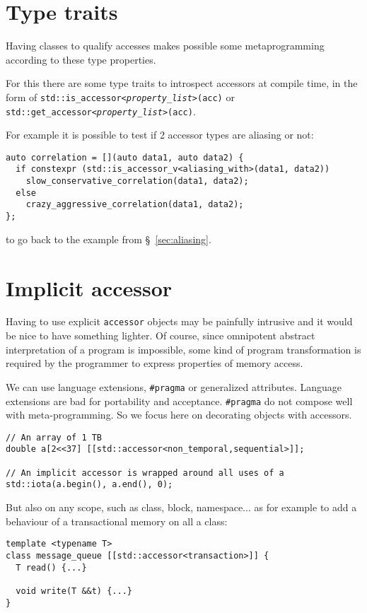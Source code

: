 \documentclass[a4paper]{article}
\begin{document}
\section{Type traits}
\label{sec:type-traits}

Having classes to qualify accesses makes possible some metaprogramming
according to these type properties.

For this there are some type traits to introspect accessors at compile
time, in the form of
\texttt{std::is\_accessor<\emph{property\_list}>(acc)} or
\texttt{std::get\_accessor<\emph{property\_list}>(acc)}.

For example it is possible to test if 2 accessor types are aliasing or
not:
\begin{lstlisting}
auto correlation = [](auto data1, auto data2) {
  if constexpr (std::is_accessor_v<aliasing_with>(data1, data2))
    slow_conservative_correlation(data1, data2);
  else
    crazy_aggressive_correlation(data1, data2);
};
\end{lstlisting}
to go back to the example from \S~\ref{sec:aliasing}.


\section{Implicit accessor}
\label{sec:implicit-accessor}

Having to use explicit \texttt{accessor} objects may be painfully
intrusive and it would be nice to have something lighter. Of course,
since omnipotent abstract interpretation of a program is impossible,
some kind of program transformation is required by the programmer to
express properties of memory access.

We can use language extensions, \lstinline|#pragma| or generalized
attributes. Language extensions are bad for portability and
acceptance. \lstinline|#pragma| do not compose well with
meta-programming. So we focus here on decorating objects with
accessors.

\begin{lstlisting}
// An array of 1 TB
double a[2<<37] [[std::accessor<non_temporal,sequential>]];

// An implicit accessor is wrapped around all uses of a
std::iota(a.begin(), a.end(), 0);
\end{lstlisting}

But also on any scope, such as class, block, namespace... as for
example to add a behaviour of a transactional memory on all a class:
\begin{lstlisting}
template <typename T>
class message_queue [[std::accessor<transaction>]] {
  T read() {...}

  void write(T &&t) {...}
}
\end{lstlisting}
\end{document}
